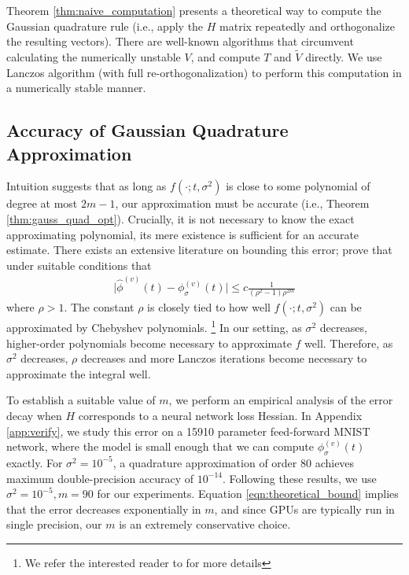 \documentclass{article}
\newcommand{\phis}{\phi_{\sigma}}
\newcommand{\phisv}{\phis^{(v)}}
\begin{document}
Theorem \ref{thm:naive_computation} presents a theoretical way to compute the Gaussian quadrature rule (i.e., apply the $H$ matrix repeatedly and orthogonalize the resulting vectors). There are well-known algorithms that circumvent calculating the  numerically unstable $V$, and compute $T$ and $\tilde{V}$ directly. We use Lanczos algorithm \cite{lanczos1950iteration} (with full re-orthogonalization) to perform this computation in a numerically stable manner.


\subsection{Accuracy of Gaussian Quadrature Approximation}
\label{sec:high_accuracy}
 Intuition suggests that as long as $f(\cdot; t, \sigma^2)$ is close to some polynomial of degree at most $2m-1$, our approximation must be accurate (i.e., Theorem \ref{thm:gauss_quad_opt}). Crucially, it is not necessary to know the exact approximating polynomial, its mere existence  is sufficient for an accurate estimate. There exists an extensive literature on bounding this error; \cite{ubaru2017fast} prove that under suitable conditions that
\begin{align} \label{eqn:theoretical_bound}
\vert \widehat{\phi}^{(v)}(t) - \phisv (t)\vert \leq c \frac{1}{(\rho^2 - 1) \rho^{2m}}
\end{align}
where $\rho > 1$. The constant $\rho$ is closely tied to how well $f(\cdot;t, \sigma^2)$ can be approximated by Chebyshev polynomials. \footnote{We refer the interested reader to \cite{ubaru2017fast, demanet2010chebyshev} for more details} In our setting, as $\sigma^2$ decreases, higher-order polynomials become necessary to approximate $f$ well. Therefore, as $\sigma^2$ decreases, $\rho$ decreases and more Lanczos iterations become necessary to approximate the integral well. 

To establish a suitable value of $m$, we perform an empirical analysis of the error decay when $H$ corresponds to a neural network loss Hessian. In Appendix \ref{app:verify}, we study this error on a 15910 parameter feed-forward MNIST network, where the model is small enough that we can compute $\phisv(t)$ exactly. For $\sigma^2 = 10^{-5}$, a quadrature approximation of order $80$ achieves maximum double-precision accuracy of $10^{-14}$. Following these results, we use $\sigma^2 = 10^{-5}, m = 90$ for our experiments. Equation \ref{eqn:theoretical_bound} implies that the error decreases exponentially in $m$, and since GPUs are typically run in single precision, our $m$ is an extremely conservative choice. 
\end{document}

